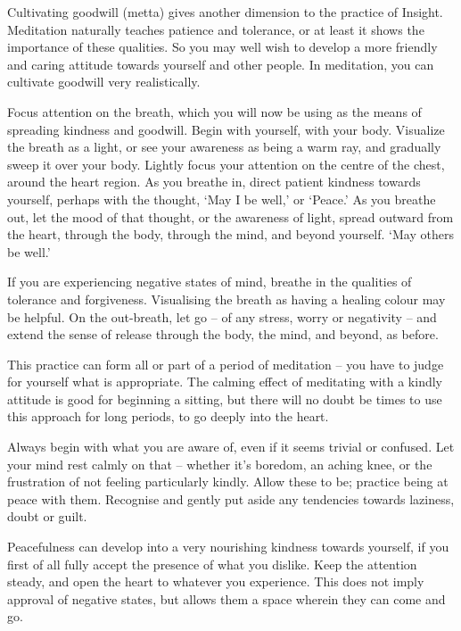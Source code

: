 
Cultivating goodwill (metta) gives another dimension to the practice of
Insight. Meditation naturally teaches patience and tolerance, or at
least it shows the importance of these qualities. So you may well wish
to develop a more friendly and caring attitude towards yourself and
other people. In meditation, you can cultivate goodwill very
realistically.

Focus attention on the breath, which you will now be using as the means
of spreading kindness and goodwill. Begin with yourself, with your body.
Visualize the breath as a light, or see your awareness as being a warm
ray, and gradually sweep it over your body. Lightly focus your attention
on the centre of the chest, around the heart region. As you breathe in,
direct patient kindness towards yourself, perhaps with the thought, `May
I be well,' or `Peace.' As you breathe out, let the mood of that
thought, or the awareness of light, spread outward from the heart,
through the body, through the mind, and beyond yourself. `May others be
well.'

If you are experiencing negative states of mind, breathe in the
qualities of tolerance and forgiveness. Visualising the breath as having
a healing colour may be helpful. On the out-breath, let go -- of any
stress, worry or negativity -- and extend the sense of release through
the body, the mind, and beyond, as before.

This practice can form all or part of a period of meditation -- you have
to judge for yourself what is appropriate. The calming effect of
meditating with a kindly attitude is good for beginning a sitting, but
there will no doubt be times to use this approach for long periods, to
go deeply into the heart.

Always begin with what you are aware of, even if it seems trivial or
confused. Let your mind rest calmly on that -- whether it's boredom, an
aching knee, or the frustration of not feeling particularly kindly.
Allow these to be; practice being at peace with them. Recognise and
gently put aside any tendencies towards laziness, doubt or guilt.

Peacefulness can develop into a very nourishing kindness towards
yourself, if you first of all fully accept the presence of what you
dislike. Keep the attention steady, and open the heart to whatever you
experience. This does not imply approval of negative states, but allows
them a space wherein they can come and go.

